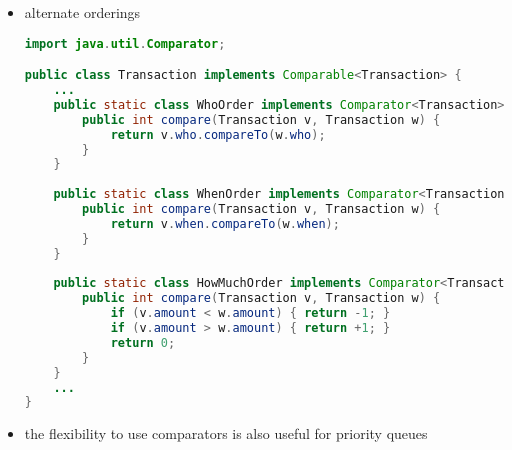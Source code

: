 \documentclass[8pt,a4paper,compress]{beamer}
\begin{document}
\begin{frame}[fragile]
\begin{itemize}
\item alternate orderings
\begin{lstlisting}[language=Java]
import java.util.Comparator;

public class Transaction implements Comparable<Transaction> {  
    ...
    public static class WhoOrder implements Comparator<Transaction> {
        public int compare(Transaction v, Transaction w) { 
            return v.who.compareTo(w.who); 
        }        
    }
    
    public static class WhenOrder implements Comparator<Transaction> {
        public int compare(Transaction v, Transaction w) { 
            return v.when.compareTo(w.when); 
        }
    }
    
    public static class HowMuchOrder implements Comparator<Transaction> {
        public int compare(Transaction v, Transaction w) {
            if (v.amount < w.amount) { return -1; }
            if (v.amount > w.amount) { return +1; }
            return 0;
        }
    }
    ...
}
\end{lstlisting}

\item the flexibility to use comparators is also useful for priority queues
\end{itemize}
\end{frame}
\end{document}
